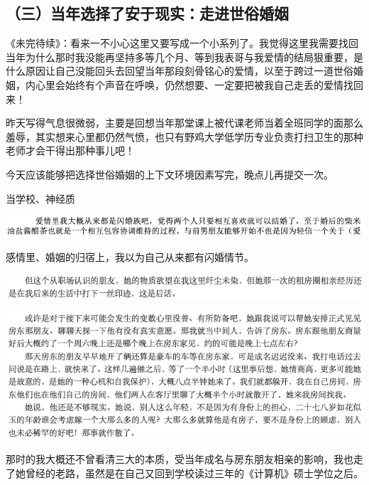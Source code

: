 \documentclass[9pt, b5paper]{article}
\begin{document}
\subsection{（三）当年选择了安于现实：走进世俗婚姻}
\label{sec:orge60f668}

《未完待续》：看来一不小心这里又要写成一个小系列了。我觉得这里我需要找回当年为什么那时我没能再坚持多等几个月、等到我表哥与我爱情的结局狠重要，是什么原因让自己没能回头去回望当年那段刻骨铭心的爱情，以至于跨过一道世俗婚姻，内心里会始终有个声音在呼唤，仍然想要、一定要把被我自己走丢的爱情找回来！

昨天写得气息很微弱，主要是回想当年那堂课上被代课老师当着全班同学的面那么羞辱，其实想来心里都仍然气愤，也只有野鸡大学低学历专业负责打扫卫生的那种老师才会干得出那种事儿吧！

今天应该能够把选择世俗婚姻的上下文环境因素写完，晚点儿再提交一次。

当学校、神经质

\begin{center}
\includegraphics[width=.9\linewidth]{./pic/backups_plans_20210423_203401.png}
\end{center}

感情里、婚姻的归宿上，我以为自己从来都有闪婚情节。

\begin{center}
\includegraphics[width=.9\linewidth]{./pic/backups_plans_20210423_204215.png}
\end{center}

\begin{center}
\includegraphics[width=.9\linewidth]{./pic/backups_plans_20210423_204134.png}
\end{center}

那时的我大概还不曾看清三大的本质，受当年成名与房东朋友相亲的影响，我也走了她曾经的老路，虽然是在自己又回到学校读过三年的《计算机》硕士学位之后。
\end{document}
